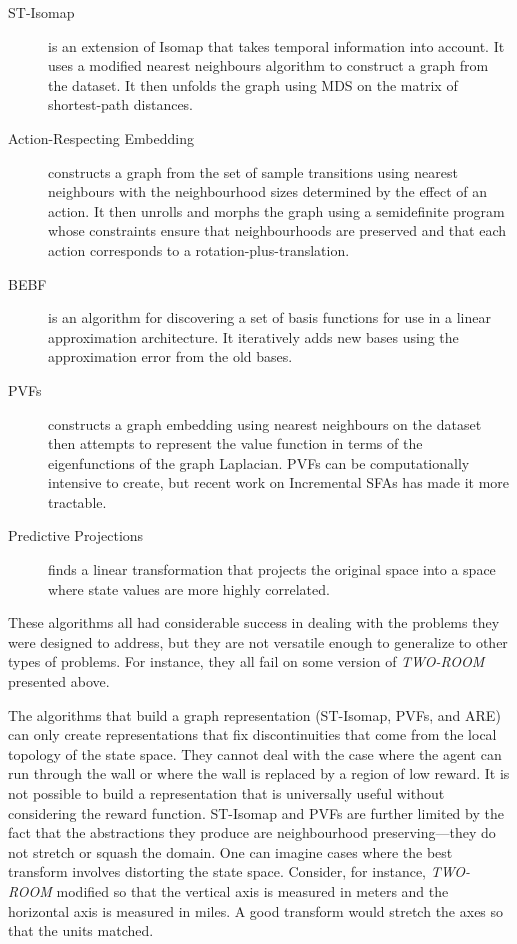 \begin{description}
\item[ST-Isomap]
\cite{jenkins} is an extension of Isomap \cite{tenen} that takes temporal
information into account.
It uses a modified nearest neighbours algorithm to construct a graph from
the dataset.
It then unfolds the graph using MDS \cite{mds} on the matrix of shortest-path
distances.

\item[Action-Respecting Embedding] \cite{bowling} constructs a graph from
the set of sample transitions using nearest neighbours with the
neighbourhood sizes determined by the effect of an action.
It then unrolls and morphs the graph using a semidefinite program whose
constraints ensure that neighbourhoods are preserved and that each action
corresponds to a rotation-plus-translation.

\item[BEBF] \cite{parr} is an algorithm for discovering a set of basis
functions for use in a linear approximation architecture. It iteratively
adds new bases using the approximation error from the old bases.

\item[PVFs] \cite{pvf} constructs a graph embedding using nearest
neighbours on the dataset then attempts to represent the value function
in terms of the eigenfunctions of the graph Laplacian.
PVFs can be computationally intensive to create, but recent work on
Incremental SFAs \cite{incsfa} has made it more tractable.

\item[Predictive Projections] \cite{sprague} finds a linear transformation
that projects the original space into a space where state values are more
highly correlated.
\end{description}

These algorithms all had considerable success in dealing with the problems
they were designed to address, but they are not versatile enough to
generalize to other types of problems. For instance, they all fail on some
version of \textit{TWO-ROOM} presented above.

The algorithms that build a graph representation (ST-Isomap, PVFs, and ARE)
can only create representations that fix discontinuities that come from the
local topology of the state space.
They cannot deal with the case where the agent can run through the wall or
where the wall is replaced by a region of low reward.
It is not possible to build a representation that is universally useful
without considering the reward function.
ST-Isomap and PVFs are further limited by the fact that the abstractions they
produce are neighbourhood preserving---they do not stretch or squash the
domain.
One can imagine cases where the best transform involves distorting the state
space.
Consider, for instance, \textit{TWO-ROOM} modified so that the vertical axis
is measured in meters and the horizontal axis is measured in miles.
A good transform would stretch the axes so that the units matched.

